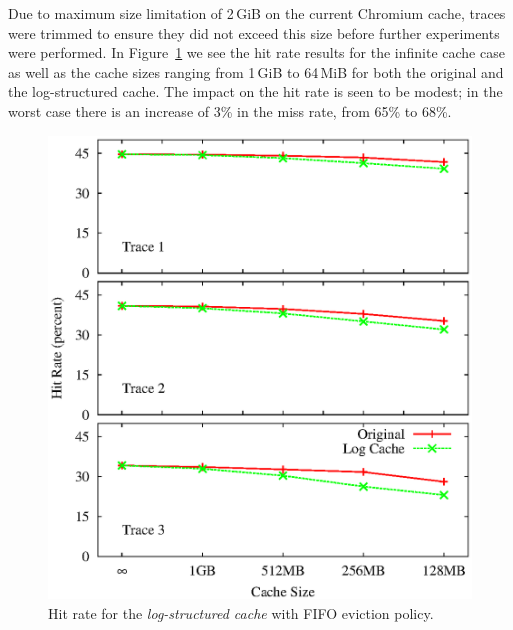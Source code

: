 \documentclass[letterpaper,twocolumn,10pt]{article}
\begin{document}
Due to maximum size limitation of 2\,GiB on the current Chromium cache, traces
were trimmed to ensure they did not exceed this size before further experiments
were performed.  In Figure~\ref{fig:hit-rate} we see the hit rate results for
the infinite cache case as well as the cache sizes ranging from 1\,GiB to
64\,MiB for both the original and the log-structured cache.
The impact on the hit rate is seen to be modest; in the worst case there is an
increase of 3\% in the miss rate, from 65\% to 68\%.

\begin{figure}[t]
  \begin{center}
    \includegraphics[width=1.04\columnwidth]{graphs/hit-rate-2}
  \end{center}
  \caption{Hit rate for the \emph{log-structured cache} with FIFO eviction
    policy.}
  \label{fig:hit-rate} 
\vspace{-0.2in}
\end{figure}
\end{document}
